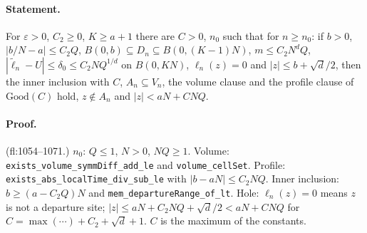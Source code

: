 \paragraph{Statement.} For $\varepsilon>0$, $C_2\geq0$, $K\geq a+1$ there are $C>0$, $n_0$ such that for $n\geq n_0$: if $b>0$, $|b/N-a|\leq C_2Q$,
$B(0,b)\subseteq D_n\subseteq B(0,(K-1)N)$, $m\leq C_2N^dQ$, $|\widetilde\ell_n-U|\leq\delta_0\leq C_2NQ^{1/d}$ on $B(0,KN)$, $\ell_n(z)=0$ and $|z|\leq b+\sqrt d/2$, then
the inner inclusion with $C$, $A_n\subseteq V_n$, the volume clause and the profile clause of $\mathrm{Good}(C)$ hold, $z\notin A_n$ and $|z|<aN+CNQ$.
\paragraph{Proof.} (fl:1054--1071.) $n_0$: $Q\leq1$, $N>0$, $NQ\geq1$. Volume: \texttt{exists\_volume\_symmDiff\_add\_le} and \texttt{volume\_cellSet}. Profile:
\texttt{exists\_abs\_localTime\_div\_sub\_le} with $|b-aN|\leq C_2NQ$. Inner inclusion: $b\geq(a-C_2Q)N$ and \texttt{mem\_departureRange\_of\_lt}. Hole: $\ell_n(z)=0$
means $z$ is not a departure site; $|z|\leq aN+C_2NQ+\sqrt d/2<aN+CNQ$ for $C=\max(\cdots)+C_2+\sqrt d+1$. $C$ is the maximum of the constants.
